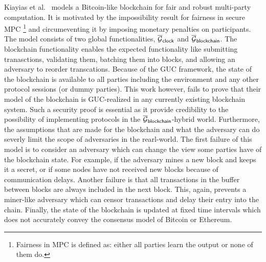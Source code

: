 Kiayias et al.~\cite{kiayias2016fair} models a Bitcoin-like blockchain for fair and robust multi-party computation.
It is motivated by the impossibility result for fairness in secure MPC \footnote{Fairness in MPC is defined as: either all parties learn the output or none of them do.} and circumeventing it by imposing monetary penalties on participants.
The model consists of two global functionalities, ${\overline{\mathcal{G}}}_{{\mathsf {clock}}}$ and ${\overline{\mathcal{G}}}_{{\mathsf {blockchain}}}$.
The blockchain functionality enables the expected functionality like submitting tranasctions, validating them, batching them into blocks, and allowing an adversary to reorder transcations.
Because of the GUC framework, the state of the blockchain is available to all parties including the environment and any other protocol sessions (or dummy parties).
This work however, fails to prove that their model of the blockchain is GUC-realized in any currently existing blockchain system.
Such a security proof is essential as it provide credibility to the possibility of implementing protocols in the ${\overline{\mathcal{G}}}_{{\mathsf {blockchain}}}$-hybrid world.
Furthermore, the assumptions that are made for the blockchain and what the adversary can do severly limit the scope of adversaries in the rearl-world.
The first failure of this model is to consider an adversary which can change the view some parties have of the blockchain state.
For example, if the adversary mines a new block and keeps it a secret, or if some nodes have not received new blocks because of communication delays.
Another failure is that all transactions in the buffer between blocks are always included in the next block.
This, again, prevents a miner-like adversary which can censor transactions and delay their entry into the chain.
Finally, the state of the blockchain is updated at fixed time intervals which does not accurately convey the consensus model of Bitcoin or Ethereum.


